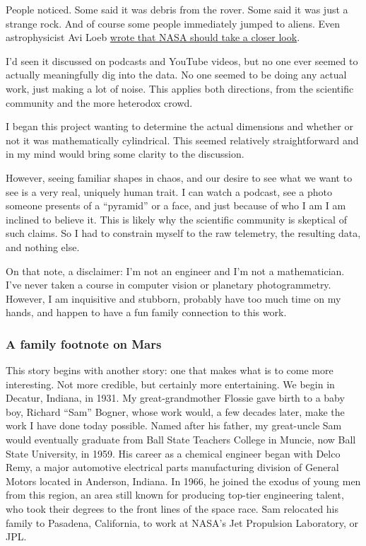 \documentclass[11pt,a4paper]{article}
\begin{document}
People noticed. Some said it was debris from the rover. Some said it was just a strange rock. And of course some people immediately jumped to aliens. Even astrophysicist Avi Loeb \href{https://avi-loeb.medium.com/is-the-mysterious-cylinder-on-mars-photographed-in-2022-by-the-curiosity-rover-a-human-made-6fcd8e242fea}{wrote that NASA should take a closer look}.

I'd seen it discussed on podcasts and YouTube videos, but no one ever seemed to actually meaningfully dig into the data. No one seemed to be doing any actual work, just making a lot of noise. This applies both directions, from the scientific community and the more heterodox crowd.

I began this project wanting to determine the actual dimensions and whether or not it was mathematically cylindrical. This seemed relatively straightforward and in my mind would bring some clarity to the discussion.

However, seeing familiar shapes in chaos, and our desire to see what we want to see is a very real, uniquely human trait. I can watch a podcast, see a photo someone presents of a ``pyramid'' or a face, and just because of who I am I am inclined to believe it. This is likely why the scientific community is skeptical of such claims. So I had to constrain myself to the raw telemetry, the resulting data, and nothing else.

On that note, a disclaimer: I'm not an engineer and I'm not a mathematician. I've never taken a course in computer vision or planetary photogrammetry. However, I am inquisitive and stubborn, probably have too much time on my hands, and happen to have a fun family connection to this work.

\subsubsection*{A family footnote on Mars}

This story begins with another story: one that makes what is to come more interesting. Not more credible, but certainly more entertaining. We begin in Decatur, Indiana, in 1931. My great-grandmother Flossie gave birth to a baby boy, Richard ``Sam'' Bogner, whose work would, a few decades later, make the work I have done today possible. Named after his father, my great-uncle Sam would eventually graduate from Ball State Teachers College in Muncie, now Ball State University, in 1959. His career as a chemical engineer began with Delco Remy, a major automotive electrical parts manufacturing division of General Motors located in Anderson, Indiana. In 1966, he joined the exodus of young men from this region, an area still known for producing top-tier engineering talent, who took their degrees to the front lines of the space race. Sam relocated his family to Pasadena, California, to work at NASA's Jet Propulsion Laboratory, or JPL.
\end{document}
